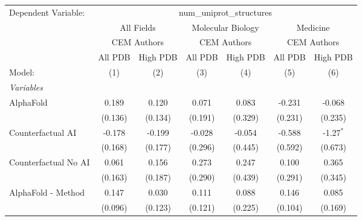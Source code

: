 \begingroup
\centering
\begin{tabular}{lcccccc}
   \tabularnewline \midrule \midrule
   Dependent Variable: & \multicolumn{6}{c}{num\_uniprot\_structures}\\
 & \multicolumn{2}{c}{All Fields} & \multicolumn{2}{c}{Molecular Biology} & \multicolumn{2}{c}{Medicine} \\
\cmidrule(lr){2-3} \cmidrule(lr){4-5} \cmidrule(lr){6-7}
 & \multicolumn{2}{c}{CEM Authors} & \multicolumn{2}{c}{CEM Authors} & \multicolumn{2}{c}{CEM Authors} \\
\cmidrule(lr){2-3} \cmidrule(lr){4-5} \cmidrule(lr){6-7}
 & \multicolumn{1}{c}{All PDB} & \multicolumn{1}{c}{High PDB} & \multicolumn{1}{c}{All PDB} & \multicolumn{1}{c}{High PDB} & \multicolumn{1}{c}{All PDB} & \multicolumn{1}{c}{High PDB} \\
\cmidrule(lr){2-2} \cmidrule(lr){3-3} \cmidrule(lr){4-4} \cmidrule(lr){5-5} \cmidrule(lr){6-6} \cmidrule(lr){7-7}
   Model:                                                     & (1)     & (2)     & (3)     & (4)     & (5)          & (6)\\  
   \midrule
   \emph{Variables}\\
   AlphaFold                                                  & 0.189   & 0.120   & 0.071   & 0.083   & -0.231       & -0.068\\   
                                                              & (0.136) & (0.134) & (0.191) & (0.329) & (0.231)      & (0.235)\\   
   Counterfactual AI                                          & -0.178  & -0.199  & -0.028  & -0.054  & -0.588       & -1.27$^{*}$\\   
                                                              & (0.168) & (0.177) & (0.296) & (0.445) & (0.592)      & (0.673)\\   
   Counterfactual No AI                                       & 0.061   & 0.156   & 0.273   & 0.247   & 0.100        & 0.365\\   
                                                              & (0.163) & (0.187) & (0.290) & (0.439) & (0.291)      & (0.345)\\   
   AlphaFold - Method                                         & 0.147   & 0.030   & 0.111   & 0.088   & 0.146        & 0.085\\   
                                                              & (0.096) & (0.123) & (0.121) & (0.225) & (0.104)      & (0.169)\\   

\end{tabular}
